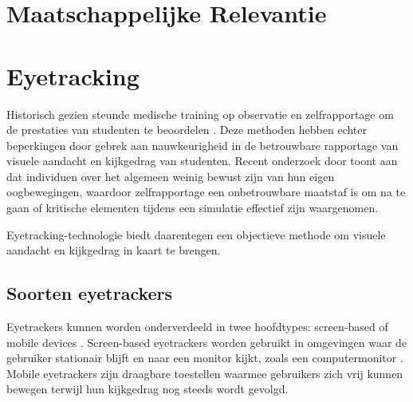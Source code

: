 \section{Maatschappelijke Relevantie}


\section{Eyetracking}

Historisch gezien steunde medische training op observatie en zelfrapportage om de prestaties van studenten te beoordelen \autocite{Pauszek2023}. 
Deze methoden hebben echter beperkingen door gebrek aan nauwkeurigheid in de betrouwbare rapportage van visuele aandacht en kijkgedrag van studenten.
Recent onderzoek door \textcite{Clarke2017} toont aan dat individuen over het algemeen weinig bewust zijn van hun eigen oogbewegingen, 
waardoor zelfrapportage een onbetrouwbare maatstaf is om na te gaan of kritische elementen tijdens een simulatie effectief zijn waargenomen.

Eyetracking-technologie biedt daarentegen een objectieve methode om visuele aandacht en kijkgedrag in kaart te brengen. 

\subsection{Soorten eyetrackers}

Eyetrackers kunnen worden onderverdeeld in twee hoofdtypes: screen-based of mobile devices \autocite{Pauszek2023}.
Screen-based eyetrackers worden gebruikt in omgevingen waar de gebruiker stationair blijft en naar een monitor kijkt, zoals een computermonitor .
Mobile eyetrackers zijn draagbare toestellen waarmee gebruikers zich vrij kunnen bewegen terwijl hun kijkgedrag nog steeds wordt gevolgd.

